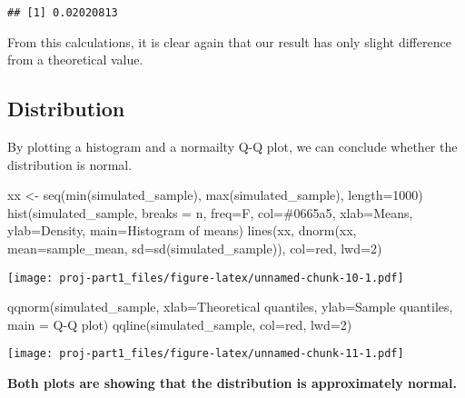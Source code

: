 \documentclass[
]{article}
\newenvironment{Shaded}{\begin{snugshade}}{\end{snugshade}}
\newcommand{\AttributeTok}[1]{\textcolor[rgb]{0.77,0.63,0.00}{#1}}
\newcommand{\DecValTok}[1]{\textcolor[rgb]{0.00,0.00,0.81}{#1}}
\newcommand{\FunctionTok}[1]{\textcolor[rgb]{0.00,0.00,0.00}{#1}}
\newcommand{\NormalTok}[1]{#1}
\newcommand{\OtherTok}[1]{\textcolor[rgb]{0.56,0.35,0.01}{#1}}
\newcommand{\StringTok}[1]{\textcolor[rgb]{0.31,0.60,0.02}{#1}}
\begin{document}
\begin{verbatim}
## [1] 0.02020813
\end{verbatim}

From this calculations, it is clear again that our result has only
slight difference from a theoretical value.

\hypertarget{distribution}{%
\subsection{Distribution}\label{distribution}}

By plotting a histogram and a normailty Q-Q plot, we can conclude
whether the distribution is normal.

\begin{Shaded}
\begin{Highlighting}[]
\NormalTok{xx }\OtherTok{\textless{}{-}} \FunctionTok{seq}\NormalTok{(}\FunctionTok{min}\NormalTok{(simulated\_sample), }\FunctionTok{max}\NormalTok{(simulated\_sample), }\AttributeTok{length=}\DecValTok{1000}\NormalTok{)}
\FunctionTok{hist}\NormalTok{(simulated\_sample, }\AttributeTok{breaks =}\NormalTok{ n, }\AttributeTok{freq=}\NormalTok{F, }\AttributeTok{col=}\StringTok{\textquotesingle{}\#0665a5\textquotesingle{}}\NormalTok{, }\AttributeTok{xlab=}\StringTok{\textquotesingle{}Means\textquotesingle{}}\NormalTok{, }\AttributeTok{ylab=}\StringTok{\textquotesingle{}Density\textquotesingle{}}\NormalTok{, }\AttributeTok{main=}\StringTok{\textquotesingle{}Histogram of means\textquotesingle{}}\NormalTok{)}
\FunctionTok{lines}\NormalTok{(xx, }\FunctionTok{dnorm}\NormalTok{(xx, }\AttributeTok{mean=}\NormalTok{sample\_mean, }\AttributeTok{sd=}\FunctionTok{sd}\NormalTok{(simulated\_sample)), }\AttributeTok{col=}\StringTok{\textquotesingle{}red\textquotesingle{}}\NormalTok{, }\AttributeTok{lwd=}\DecValTok{2}\NormalTok{)}
\end{Highlighting}
\end{Shaded}

\texttt{[image: proj-part1\_files/figure-latex/unnamed-chunk-10-1.pdf]}

\begin{Shaded}
\begin{Highlighting}[]
\FunctionTok{qqnorm}\NormalTok{(simulated\_sample, }\AttributeTok{xlab=}\StringTok{\textquotesingle{}Theoretical quantiles\textquotesingle{}}\NormalTok{, }\AttributeTok{ylab=}\StringTok{\textquotesingle{}Sample quantiles\textquotesingle{}}\NormalTok{, }\AttributeTok{main =} \StringTok{\textquotesingle{}Q{-}Q plot\textquotesingle{}}\NormalTok{)}
\FunctionTok{qqline}\NormalTok{(simulated\_sample, }\AttributeTok{col=}\StringTok{\textquotesingle{}red\textquotesingle{}}\NormalTok{, }\AttributeTok{lwd=}\DecValTok{2}\NormalTok{)}
\end{Highlighting}
\end{Shaded}

\texttt{[image: proj-part1\_files/figure-latex/unnamed-chunk-11-1.pdf]}

\textbf{Both plots are showing that the distribution is approximately
normal.}
\end{document}
